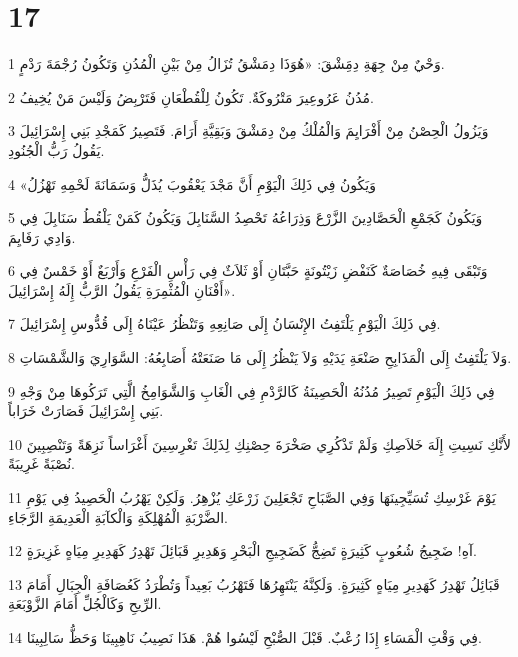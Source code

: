 \chapter{17}

\par 1 وَحْيٌ مِنْ جِهَةِ دِمَِشْقَ: «هُوَذَا دِمَشْقُ تُزَالُ مِنْ بَيْنِ الْمُدُنِ وَتَكُونُ رُجْمَةَ رَدْمٍ.
\par 2 مُدُنُ عَرُوعِيرَ مَتْرُوكَةٌ. تَكُونُ لِلْقُطْعَانِ فَتَرْبِضُ وَلَيْسَ مَنْ يُخِيفُ.
\par 3 وَيَزُولُ الْحِصْنُ مِنْ أَفْرَايِمَ وَالْمُلْكُ مِنْ دِمَشْقَ وَبَقِيَّةِ أَرَامَ. فَتَصِيرُ كَمَجْدِ بَنِي إِسْرَائِيلَ يَقُولُ رَبُّ الْجُنُودِ.
\par 4 «وَيَكُونُ فِي ذَلِكَ الْيَوْمِ أَنَّ مَجْدَ يَعْقُوبَ يُذَلُّ وَسَمَانَةَ لَحْمِهِ تَهْزُلُ
\par 5 وَيَكُونُ كَجَمْعِ الْحَصَّادِينَ الزَّرْعَ وَذِرَاعُهُ تَحْصِدُ السَّنَابِلَ وَيَكُونُ كَمَنْ يَلْقُطُ سَنَابِلَ فِي وَادِي رَفَايِمَ.
\par 6 وَتَبْقَى فِيهِ خُصَاصَةٌ كَنَفْضِ زَيْتُونَةٍ حَبَّتَانِ أَوْ ثَلاَثٌ فِي رَأْسِ الْفَرْعِ وَأَرْبَعٌ أَوْ خَمْسٌ فِي أَفْنَانِ الْمُثْمِرَةِ يَقُولُ الرَّبُّ إِلَهُ إِسْرَائِيلَ».
\par 7 فِي ذَلِكَ الْيَوْمِ يَلْتَفِتُ الإِنْسَانُ إِلَى صَانِعِهِ وَتَنْظُرُ عَيْنَاهُ إِلَى قُدُّوسِ إِسْرَائِيلَ.
\par 8 وَلاَ يَلْتَفِتُ إِلَى الْمَذَابِحِ صَنْعَةِ يَدَيْهِ وَلاَ يَنْظُرُ إِلَى مَا صَنَعَتْهُ أَصَابِعُهُ: السَّوَارِيَ وَالشَّمْسَاتِ.
\par 9 فِي ذَلِكَ الْيَوْمِ تَصِيرُ مُدُنُهُ الْحَصِينَةُ كَالرَّدْمِ فِي الْغَابِ وَالشَّوَامِخُ الَّتِي تَرَكُوهَا مِنْ وَجْهِ بَنِي إِسْرَائِيلَ فَصَارَتْ خَرَاباً.
\par 10 لأَنَّكِ نَسِيتِ إِلَهَ خَلاَصِكِ وَلَمْ تَذْكُرِي صَخْرَةَ حِصْنِكِ لِذَلِكَ تَغْرِسِينَ أَغْرَاساً نَزِهَةً وَتَنْصِبِينَ نُصْبَةً غَرِيبَةً.
\par 11 يَوْمَ غَرْسِكِ تُسَيِّجِينَهَا وَفِي الصَّبَاحِ تَجْعَلِينَ زَرْعَكِ يُزْهِرُ. وَلَكِنْ يَهْرُبُ الْحَصِيدُ فِي يَوْمِ الضَّرْبَةِ الْمُهْلِكَةِ وَالْكآبَةِ الْعَدِيمَةِ الرَّجَاءِ.
\par 12 آهِ! ضَجِيجُ شُعُوبٍ كَثِيرَةٍ تَضِجُّ كَضَجِيجِ الْبَحْرِ وَهَدِيرِ قَبَائِلَ تَهْدِرُ كَهَدِيرِ مِيَاهٍ غَزِيرَةٍ.
\par 13 قَبَائِلُ تَهْدِرُ كَهَدِيرِ مِيَاهٍ كَثِيرَةٍ. وَلَكِنَّهُ يَنْتَهِرُهَا فَتَهْرُبُ بَعِيداً وَتُطْرَدُ كَعُصَافَةِ الْجِبَالِ أَمَامَ الرِّيحِ وَكَالْجُلِّ أَمَامَ الزَّوْبَعَةِ.
\par 14 فِي وَقْتِ الْمَسَاءِ إِذَا رُعْبٌ. قَبْلَ الصُّبْحِ لَيْسُوا هُمْ. هَذَا نَصِيبُ نَاهِبِينَا وَحَظُّ سَالِبِينَا.

